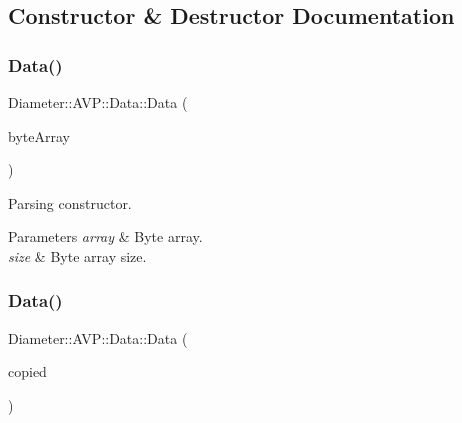 \subsection{Constructor \& Destructor Documentation}
\mbox{\label{classDiameter_1_1AVP_1_1Data_a204b2752879567b7db58d0b1f567152d}} 
\subsubsection{\texorpdfstring{Data()}{Data()}\hspace{0.1cm}{\footnotesize\ttfamily [1/2]}}
{\footnotesize\ttfamily Diameter\+::\+A\+V\+P\+::\+Data\+::\+Data (\begin{DoxyParamCaption}\item[{const Byte\+Array \&}]{byte\+Array }\end{DoxyParamCaption})\hspace{0.3cm}{\ttfamily [explicit]}}



Parsing constructor. 


\begin{DoxyParams}{Parameters}
{\em array} & Byte array. \\
\hline
{\em size} & Byte array size. \\
\hline
\end{DoxyParams}
\mbox{\label{classDiameter_1_1AVP_1_1Data_a156c0f23cc44db70a41d609795e76f4c}} 
\subsubsection{\texorpdfstring{Data()}{Data()}\hspace{0.1cm}{\footnotesize\ttfamily [2/2]}}
{\footnotesize\ttfamily Diameter\+::\+A\+V\+P\+::\+Data\+::\+Data (\begin{DoxyParamCaption}\item[{const \hyperlink{classDiameter_1_1AVP_1_1Data}{Data} \&}]{copied }\end{DoxyParamCaption})\hspace{0.3cm}{\ttfamily [default]}}



